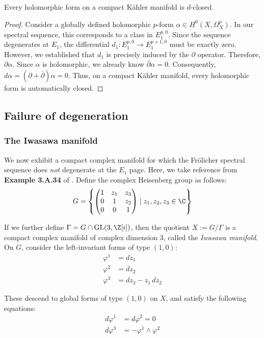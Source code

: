 \begin{corollary}
    Every holomorphic form on a compact K\"ahler manifold is $d$-closed.
\end{corollary}

\begin{proof}
    Consider a globally defined holomorphic $p$-form $\alpha \in H^0\left(X, \Omega_X^p\right)$. In our spectral sequence, this corresponds to a class in $E_1^{p,0}$. Since the sequence degenerates at $E_1$, the differential $d_1: E_1^{p,0} \to E_1^{p+1, 0}$ must be exactly zero. However, we established that $d_1$ is precisely induced by the $\partial$ operator. Therefore, $\partial \alpha$. Since $\alpha$ is holomorphic, we already know $\bar\partial \alpha =0$. Consequently, $d\alpha = (\partial + \bar{\partial})\alpha = 0$. Thus, on a compact K\"ahler manifold, every holomorphic form is automatically closed.
\end{proof}

\subsection{Failure of degeneration}
\subsubsection{The Iwasawa manifold}

We now exhibit a compact complex manifold for which the Fr\"olicher spectral sequence does \emph{not}
degenerate at the $E_1$ page. Here, we take reference from \textbf{Example 3.A.34} of \cite{Huybrechts2005}. Define the complex Heisenberg group as follows:
$$
G=\left\{ \begin{pmatrix}
1 & z_1 & z_3\\ 0 & 1 & z_2\\ 0 & 0 & 1\end{pmatrix} \mid z_1,z_2,z_3\in\C \right\}
$$

\noindent If we further define $\Gamma = G\cap \mathrm{GL}(3,\Z[i])$, then the quotient $X:=G/\Gamma$ is a compact complex manifold of complex dimension $3$, called the \emph{Iwasawa manifold}. On $G$, consider the left-invariant forms of type $(1,0)$:
\begin{align*}
\varphi^1 &= dz_1\\
\varphi^2 &= dz_2\\
\varphi^3 &= dz_3 - z_1 \,dz_2
\end{align*}

\noindent These descend to global forms of type $(1,0)$ on $X$, and satisfy the following equations:
\begin{align*}
d\varphi^1 &= d\varphi^2 = 0 \\
d\varphi^3 &= -\varphi^1\wedge \varphi^2
\end{align*}

